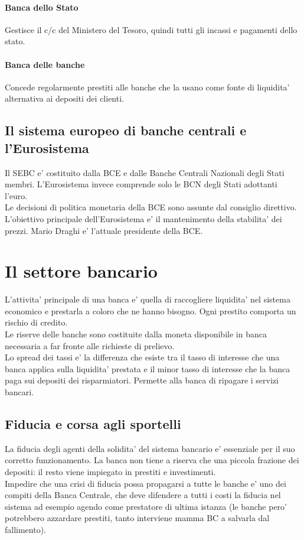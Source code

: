 \documentclass{report}
\begin{document}
	\paragraph{Banca dello Stato} Gestisce il c/c del Ministero del Tesoro, quindi tutti gli incassi e pagamenti dello stato.
	\paragraph{Banca delle banche} Concede regolarmente prestiti alle banche che la usano come fonte di liquidita' alternativa ai depositi dei clienti.
	\subsection{Il sistema europeo di banche centrali e l'Eurosistema}
	Il SEBC e' costituito dalla BCE e dalle Banche Centrali Nazionali degli Stati membri. L'Eurosistema invece comprende solo le BCN degli Stati adottanti l'euro.
	\medskip \\Le decisioni di politica monetaria della BCE sono assunte dal consiglio direttivo. L'obiettivo principale dell'Eurosistema e' il mantenimento della stabilita' dei prezzi. Mario Draghi e' l'attuale presidente della BCE.
	\section{Il settore bancario}
	L'attivita' principale di una banca e' quella di raccogliere liquidita' nel sistema economico e prestarla a coloro che ne hanno bisogno. Ogni prestito comporta un rischio di credito.
	\medskip \\Le riserve delle banche sono costituite dalla moneta disponibile in banca  necessaria a far fronte alle richieste di prelievo.
	\medskip \\Lo spread dei tassi e' la differenza che esiste tra il tasso di interesse che una banca applica sulla liquidita' prestata e il minor tasso di interesse che la banca paga sui depositi dei risparmiatori. Permette alla banca di ripagare i servizi bancari.
	\subsection{Fiducia e corsa agli sportelli}
	La fiducia degli agenti della solidita' del sistema bancario e' essenziale per il suo corretto funzionamento. La banca non tiene a riserva che una piccola frazione dei depositi: il resto viene impiegato in prestiti e investimenti.
	\medskip \\Impedire che una crisi di fiducia possa propagarsi a tutte le banche e' uno dei compiti della Banca Centrale, che deve difendere a tutti i costi la fiducia nel sistema ad esempio agendo come prestatore di ultima istanza (le banche pero' potrebbero azzardare prestiti, tanto interviene mamma BC a salvarla dal fallimento).
\end{document}
